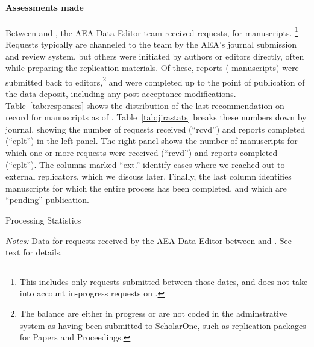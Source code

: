 \begin{center}
	\label{tab:responses}
	\centering
	
 \end{center}


\paragraph{Assessments made}

Between \firstday{} and \lastday{}, the AEA Data Editor team  received
\jiraissues{} requests,  for \jiramcs{} manuscripts.%
%
\footnote{This includes only requests submitted between those dates, and does not take into account in-progress requests on \firstday{}.}
%
Requests typically are channeled to the team by the AEA's journal submission and review system, but others were initiated by authors or editors directly, often while preparing the replication materials. Of these,  \jiraissuescplt{} reports (\jiramcscplt{} manuscripts) were submitted back to editors,\footnote{The balance are either in progress or are not coded in the adminstrative system as having been submitted to ScholarOne, such as replication packages for Papers and Proceedings.} and \jiramcspending{} were completed up to the point of publication of the data deposit, including any post-acceptance modifications.  Table~\ref{tab:responses} shows the distribution of the last recommendation on record for manuscripts as of \lastday{}.  Table~\ref{tab:jirastats} breaks these numbers down by journal, showing the number of requests received (``rcvd'') and  reports completed (``cplt'') in the left panel. The right panel shows the number of manuscripts for which one or more requests were received (``rcvd'') and reports completed (``cplt''). The columns marked ``ext.'' identify cases where we reached out to external replicators, which we discuss later. Finally, the last column identifies manuscripts for which the entire process has been completed, and which are ``pending'' publication.
%

\begin{table}[]
    \caption{Processing Statistics}
    \label{tab:jirastats}
    \begin{threeparttable}
    \centering
    
    \begin{tablenotes}
    \footnotesize
    \item[] \textit{Notes:} Data for requests received by the AEA Data Editor between \firstday{} and \lastday{}. %
    See text for details.
    \end{tablenotes}
 \end{threeparttable}
 
   \end{table}





